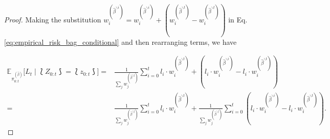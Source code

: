 \begin{proof}
Making the substitution $w_i^{(\hat\beta^{\backslash i})} = w_i^{(\hat\beta^{\backslash i})} + (w_i^{(\hat\beta^{\backslash t})} - w_i^{(\hat\beta^{\backslash t})})$ in Eq. \eqref{eq:empirical_risk_bag_conditional} and then rearranging terms, we have

\begin{align*}
    \mathbb{E}_{\pi_{0:t}^{(\hat\beta)}}\Big[L_{t} \mid \lbag Z_{0:t} \rbag = \lbag z_{0:t} \rbag\Big] 
    = & \frac{1}{\sum_{j}w_j^{(\hat\beta^{\backslash j})}}\sum_{i=0}^{t}l_i\cdot w_i^{(\hat\beta^{\backslash t})} +  (l_i\cdot w_i^{(\hat\beta^{\backslash i})} - l_i\cdot w_i^{(\hat\beta^{\backslash t})}) \nonumber \\
    = & \frac{1}{\sum_{j}w_j^{(\hat\beta^{\backslash j})}}\sum_{i=0}^{t}l_i\cdot w_i^{(\hat\beta^{\backslash t})} +  \frac{1}{\sum_{j}w_j^{(\hat\beta^{\backslash j})}}\sum_{i=0}^{t}(l_i\cdot w_i^{(\hat\beta^{\backslash i})} - l_i\cdot w_i^{(\hat\beta^{\backslash t})}).
\end{align*}


\end{proof}
